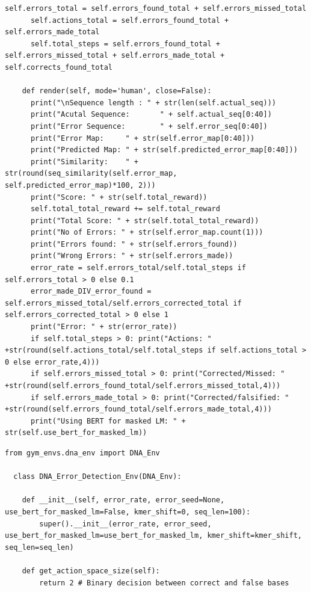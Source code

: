 \documentclass[oneside,bibliography=totocnumbered,BCOR=5mm]{scrbook}%
\theoremstyle{definition}
\theoremstyle{definition}
\theoremstyle{definition}
\theoremstyle{definition}
\theoremstyle{definition}
\theoremstyle{definition}
\begin{document}
\begin{appendix}
\begin{lstlisting}[caption={DNA-Environment Basisklasse}]
      self.errors_total = self.errors_found_total + self.errors_missed_total
      self.actions_total = self.errors_found_total + self.errors_made_total
      self.total_steps = self.errors_found_total + self.errors_missed_total + self.errors_made_total + self.corrects_found_total

    def render(self, mode='human', close=False):
      print("\nSequence length : " + str(len(self.actual_seq)))
      print("Acutal Sequence:       " + self.actual_seq[0:40])
      print("Error Sequence:        " + self.error_seq[0:40])
      print("Error Map:     " + str(self.error_map[0:40]))
      print("Predicted Map: " + str(self.predicted_error_map[0:40]))
      print("Similarity:    " + str(round(seq_similarity(self.error_map, self.predicted_error_map)*100, 2)))
      print("Score: " + str(self.total_reward))
      self.total_total_reward += self.total_reward
      print("Total Score: " + str(self.total_total_reward))
      print("No of Errors: " + str(self.error_map.count(1)))
      print("Errors found: " + str(self.errors_found))
      print("Wrong Errors: " + str(self.errors_made))
      error_rate = self.errors_total/self.total_steps if self.errors_total > 0 else 0.1
      error_made_DIV_error_found = self.errors_missed_total/self.errors_corrected_total if self.errors_corrected_total > 0 else 1
      print("Error: " + str(error_rate))
      if self.total_steps > 0: print("Actions: " +str(round(self.actions_total/self.total_steps if self.actions_total > 0 else error_rate,4)))
      if self.errors_missed_total > 0: print("Corrected/Missed: " +str(round(self.errors_found_total/self.errors_missed_total,4)))
      if self.errors_made_total > 0: print("Corrected/falsified: " +str(round(self.errors_found_total/self.errors_made_total,4)))
      print("Using BERT for masked LM: " + str(self.use_bert_for_masked_lm))
\end{lstlisting}
 
\begin{lstlisting}[caption={DNA-Environment für Fehlererkennung}]
  from gym_envs.dna_env import DNA_Env

  class DNA_Error_Detection_Env(DNA_Env):

    def __init__(self, error_rate, error_seed=None, use_bert_for_masked_lm=False, kmer_shift=0, seq_len=100):
        super().__init__(error_rate, error_seed, use_bert_for_masked_lm=use_bert_for_masked_lm, kmer_shift=kmer_shift, seq_len=seq_len)

    def get_action_space_size(self):
        return 2 # Binary decision between correct and false bases


\end{lstlisting}
\end{appendix}
\end{document}
